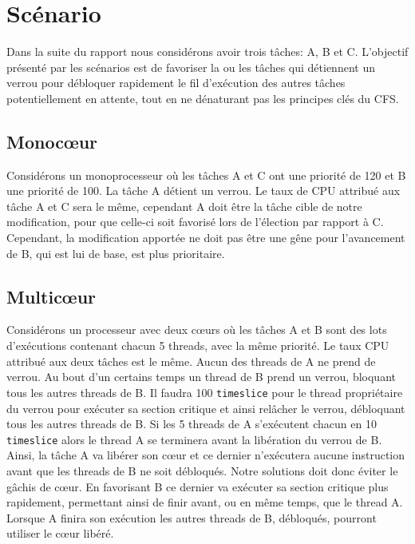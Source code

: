 \section{Scénario}

Dans la suite du rapport nous considérons avoir trois tâches: A, B et C. 
L'objectif présenté par les scénarios est de favoriser
la ou les tâches qui détiennent un verrou pour débloquer rapidement le fil d'exécution
des autres tâches potentiellement en attente, tout en ne dénaturant pas les principes
clés du CFS.

\subsection{Monocœur}

Considérons un monoprocesseur où les tâches A et C ont une priorité de 120 et 
B une priorité de 100. La tâche A détient un verrou.
Le taux de CPU attribué aux tâche A et C sera le même, cependant A doit être
la tâche cible de notre modification, pour que celle-ci soit favorisé lors
de l'élection par rapport à C. Cependant, la modification apportée ne doit pas 
être une gêne pour l'avancement de B, qui est lui de base, est plus prioritaire.

\subsection{Multicœur}

Considérons un processeur avec deux cœurs où les tâches A et B sont des lots
d'exécutions contenant chacun 5 threads, avec la même priorité.
Le taux CPU attribué aux deux tâches est le même. Aucun des threads de A ne prend de verrou.
Au bout d'un certains temps un thread de B prend un verrou, bloquant tous les autres threads de B.
Il faudra 100 \verb|timeslice| pour le thread propriétaire du verrou pour exécuter sa section
critique et ainsi relâcher le verrou, débloquant tous les autres threads de B.
Si les 5 threads de A s'exécutent chacun en 10 \verb|timeslice| alors le thread A se terminera
avant la libération du verrou de B. Ainsi, la tâche A va libérer son cœur et ce dernier n'exécutera
aucune instruction avant que les threads de B ne soit débloqués.
Notre solutions doit donc éviter le gâchis de cœur. En favorisant B ce dernier va exécuter
sa section critique plus rapidement, permettant ainsi de finir avant, ou en même temps, que le thread A.
Lorsque A finira son exécution les autres threads de B, débloqués, pourront utiliser le cœur libéré.

